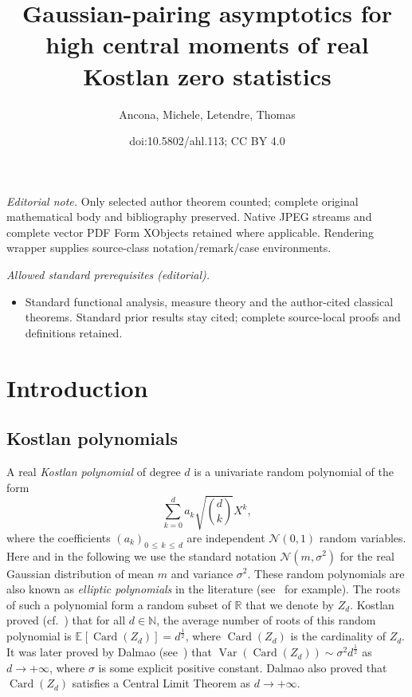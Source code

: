 \documentclass[10pt]{amsart}
\title{Gaussian-pairing asymptotics for high central moments of real Kostlan zero statistics}
\author{Ancona, Michele, Letendre, Thomas}
\date{doi:10.5802/ahl.113; CC BY 4.0}
\theoremstyle{definition}\newtheorem{defi}[theo]{Definition}\newtheorem{rema}[theo]{Remark}\newtheorem{exam}[theo]{Example}\newtheorem{exem}[theo]{Example}\newtheorem{nota}[theo]{Notation}
\DeclareMathOperator{\card}{Card}
\DeclareMathOperator{\Var}{Var}
\newcommand{\clN}{\mathcal{N}}
\newcommand{\N}{\mathbb{N}}
\newcommand{\R}{\mathbb{R}}
\newcommand{\esp}[2][]{\mathbb{E}_{#1}\!\left[#2 \right]}
\newcommand{\var}[1]{\Var\!\left(#1 \right)}
\renewcommand{\leq}{\leqslant}
\begin{document}
\maketitle
\noindent\textit{Editorial note.} Only selected author theorem counted; complete original mathematical body and bibliography preserved. Native JPEG streams and complete vector PDF Form XObjects retained where applicable. Rendering wrapper supplies source-class notation/remark/case environments.\par\medskip
\noindent\textit{Allowed standard prerequisites (editorial).}\begin{itemize}
\item Standard functional analysis, measure theory and the author-cited classical theorems. Standard prior results stay cited; complete source-local proofs and definitions retained.
\end{itemize}\medskip



\tableofcontents
\newpage


\section{Introduction}\label{sec introduction}

\subsection*{Kostlan polynomials}

A real \emph{Kostlan polynomial} of degree $d$ is a univariate random polynomial of the form
\[
\sum_{k=0}^d a_k \sqrt{\binom{d}{k}}X^k,
\]
where the coefficients $(a_k)_{0\,\leq\,k\,\leq\, d}$ are independent $\clN(0,1)$ random variables. Here and in the following we use the standard notation $\clN(m,\sigma^2)$ for the real Gaussian distribution of mean $m$ and variance $\sigma^2$. These random polynomials are also known as \emph{elliptic polynomials} in the literature (see~\cite{ST2004} for example). The roots of such a polynomial form a random subset of $\R$ that we denote by $Z_d$. Kostlan proved (cf.~\cite{Kos1993}) that for all $d \in \N$, the average number of roots of this random polynomial is $\esp{\card(Z_d)} = d^\frac{1}{2}$, where $\card(Z_d)$ is the cardinality of $Z_d$. It was later proved by Dalmao (see~\cite{Dal2015}) that $\var{\card(Z_d)} \sim \sigma^2 d^\frac{1}{2}$ as $d \to +\infty$, where $\sigma$ is some explicit positive constant. Dalmao also proved that $\card(Z_d)$ satisfies a Central Limit Theorem as $d \to +\infty$.
\end{document}
